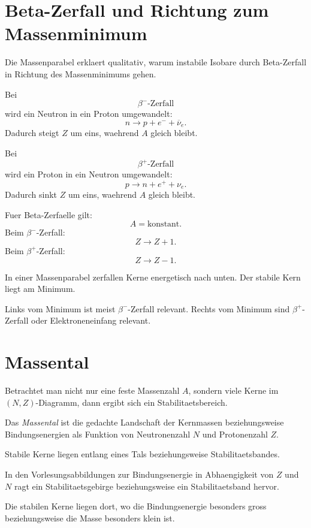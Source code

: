 \section{Beta-Zerfall und Richtung zum Massenminimum}

Die Massenparabel erklaert qualitativ, warum instabile Isobare durch Beta-Zerfall
in Richtung des Massenminimums gehen.

\begin{conceptbox}
Bei
\[
    \beta^-
\text{-Zerfall}
\]
wird ein Neutron in ein Proton umgewandelt:
\[
    n \rightarrow p + e^- + \overline{\nu}_e.
\]
Dadurch steigt $Z$ um eins, waehrend $A$ gleich bleibt.

Bei
\[
    \beta^+
\text{-Zerfall}
\]
wird ein Proton in ein Neutron umgewandelt:
\[
    p \rightarrow n + e^+ + \nu_e.
\]
Dadurch sinkt $Z$ um eins, waehrend $A$ gleich bleibt.
\end{conceptbox}

\begin{formulabox}
Fuer Beta-Zerfaelle gilt:
\[
    A=\text{konstant}.
\]
Beim $\beta^-$-Zerfall:
\[
    Z \rightarrow Z+1.
\]
Beim $\beta^+$-Zerfall:
\[
    Z \rightarrow Z-1.
\]
\end{formulabox}

\begin{examtipbox}
In einer Massenparabel zerfallen Kerne energetisch nach unten.
Der stabile Kern liegt am Minimum.

Links vom Minimum ist meist $\beta^-$-Zerfall relevant.
Rechts vom Minimum sind $\beta^+$-Zerfall oder Elektroneneinfang relevant.
\end{examtipbox}

\section{Massental}

Betrachtet man nicht nur eine feste Massenzahl $A$, sondern viele Kerne im
$(N,Z)$-Diagramm, dann ergibt sich ein Stabilitaetsbereich.

\begin{definitionbox}
Das \emph{Massental} ist die gedachte Landschaft der Kernmassen beziehungsweise
Bindungsenergien als Funktion von Neutronenzahl $N$ und Protonenzahl $Z$.

Stabile Kerne liegen entlang eines Tals beziehungsweise Stabilitaetsbandes.
\end{definitionbox}

\begin{conceptbox}
In den Vorlesungsabbildungen zur Bindungsenergie in Abhaengigkeit von $Z$ und $N$
ragt ein Stabilitaetsgebirge beziehungsweise ein Stabilitaetsband hervor.

Die stabilen Kerne liegen dort, wo die Bindungsenergie besonders gross beziehungsweise
die Masse besonders klein ist.
\end{conceptbox}

